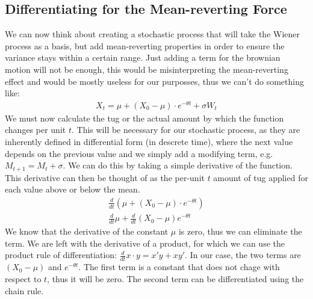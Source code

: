 \documentclass{article}
\begin{document}
\begin{spacing}{2.0}
\subsection{Differentiating for the Mean-reverting Force}

We can now think about creating a stochastic process that will take the Wiener process as a basis, but add mean-reverting properties in order to ensure
the variance stays within a certain range. Just adding a term for the brownian motion will not be enough, this would be misinterpreting the mean-reverting
effect and would be mostly useless for our purposses, thus we can't do something like:
\begin{gather*}
    X_{t} = \mu + (X_{0} - \mu) \cdot e^{-\theta t} + \sigma W_{t}
\end{gather*}
We must now calculate the tug or the actual amount by which the function changes per unit $t$. This will be necessary for our stochastic process, as they
are inherently defined in differential form (in descrete time), where the next value depends on the previous value and we simply add a modifying term, e.g.
$M_{t + 1} = M_{t} + \sigma$. We can do this by taking a simple derivative of the function. This derivative can then be thought of as the per-unit $t$ amount
of tug applied for each value above or below the mean.
\begin{gather*}
    \frac{d}{dt} \left ( \mu + \left ( X_{0} - \mu \right ) \cdot e^{-\theta t} \right ) \\
    \frac{d}{dt} \mu + \frac{d}{dt} \left ( X_{0} - \mu \right ) e^{-\theta t}
\end{gather*}
We know that the derivative of the constant $\mu$ is zero, thus we can eliminate the term. We are left with the derivative of a product, for which we can
use the product rule of differentiation: $\frac{d}{dt}x \cdot y = x'y + xy'$. In our case, the two terms are $( X_{0} - \mu )$ and $e^{-\theta t}$. The first
term is a constant that does not chage with respect to $t$, thus it will be zero. The second term can be differentiated using the chain rule.


\end{spacing}
\end{document}
